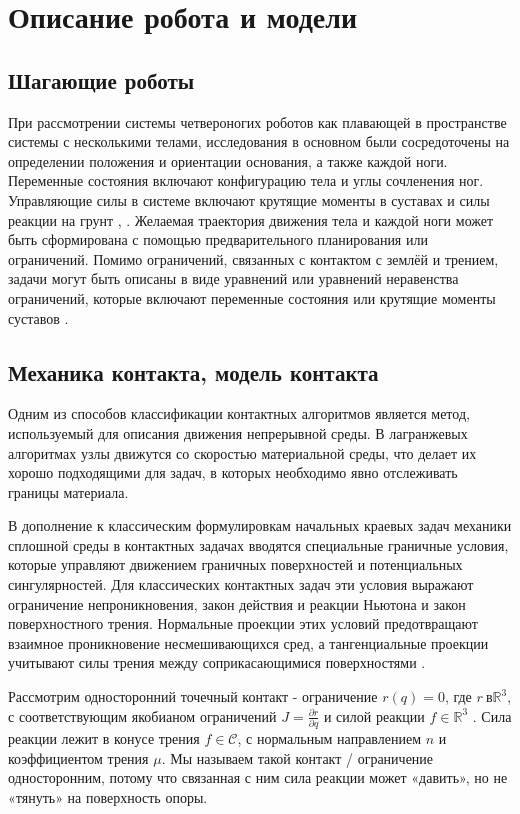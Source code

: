 \chapter{Описание робота и модели}\label{ch:ch2}
\section{Шагающие роботы}\label{sec:ch2/sec1}
При рассмотрении системы четвероногих роботов как плавающей в пространстве системы с несколькими телами, исследования в основном были сосредоточены на определении положения и ориентации основания, а также каждой ноги. Переменные состояния включают конфигурацию тела и углы сочленения ног. Управляющие силы в системе включают крутящие моменты в суставах и силы реакции на грунт \cite{henze2016}, \cite{farshidian2017robust}. Желаемая траектория движения тела и каждой ноги может быть сформирована с помощью предварительного планирования или ограничений. Помимо ограничений, связанных с контактом с землёй и трением, задачи могут быть описаны в виде уравнений или уравнений неравенства ограничений, которые включают переменные состояния или крутящие моменты суставов \cite{henze2017multi}. 

\section{Механика контакта, модель контакта}\label{sec:ch2/sect2}
Одним из способов классификации контактных алгоритмов является метод, используемый для описания движения непрерывной среды. В лагранжевых алгоритмах узлы движутся со скоростью материальной среды, что делает их хорошо подходящими для задач, в которых необходимо явно отслеживать границы материала. 

В дополнение к классическим формулировкам начальных краевых задач механики сплошной среды в контактных задачах вводятся специальные граничные условия, которые управляют движением граничных поверхностей и потенциальных сингулярностей. Для классических контактных задач эти условия выражают ограничение непроникновения, закон действия и реакции Ньютона и закон поверхностного трения. Нормальные проекции этих условий предотвращают взаимное проникновение несмешивающихся сред, а тангенциальные проекции учитывают силы трения между соприкасающимися поверхностями \cite{Shamim2024}.

Рассмотрим односторонний точечный контакт - ограничение ${r}({q}) = 0$, где ${r} \ в \mathbb{R}^3$, с соответствующим якобианом ограничений ${J} = \frac{\partial {r}}{\partial {q}}$ и силой реакции ${f} \in \mathbb{R}^3$ \cite{Posa2014}.
%
Сила реакции лежит в конусе трения ${f} \in \mathcal{C}$, с нормальным направлением ${n}$ и коэффициентом трения $\mu$.
%
Мы называем такой контакт / ограничение односторонним, потому что связанная с ним сила реакции может «давить», но не «тянуть» на поверхность опоры.

